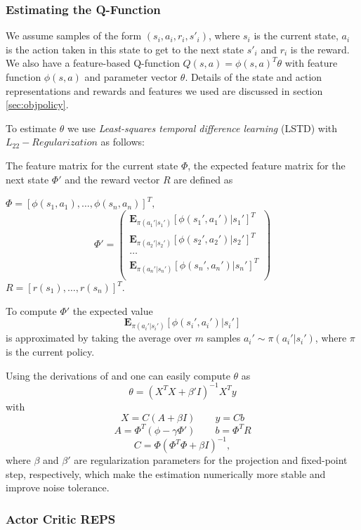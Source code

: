 \documentclass[twoside]{article}
\begin{document}
\subsubsection{Estimating the Q-Function}
\label{sec:estimateq}

We assume samples of the form $(s_i, a_i, r_i, s'_i)$,
where $s_i$ is the current state, $a_i$ is the action taken in this state to get
to the next state $s'_i$ and $r_i$ is the reward.
We also have a feature-based Q-function $Q(s, a) =
\phi(s,a)^T \theta$ with feature function $\phi(s,a)$ and parameter vector
$\theta$. Details of the state and action representations and rewards and
features we used are discussed in section \ref{sec:objpolicy}.

To estimate $\theta$ we use \emph{Least-squares temporal difference
learning} (LSTD) with $L_{22}-Regularization$\cite{lstdRegularization} as
follows:

The feature matrix for the current state $\Phi$, the expected feature matrix for
the next state $\Phi'$ and the reward vector $R$ are defined as

$\Phi = \left[\phi(s_1, a_1), \dots, \phi(s_n, a_n)\right]^T,$
$$
\Phi' = \left(
\begin{array}{c}
    \mathbf{E}_{\pi(a_1'|s_1')} [\phi(s_1', a_1') | s_1']^T \\
    \mathbf{E}_{\pi(a_2'|s_2')} [\phi(s_2', a_2') | s_2']^T \\
    \dots \\
    \mathbf{E}_{\pi(a_n'|s_n')} [\phi(s_n', a_n') | s_n']^T \\
\end{array} \right)
$$
$R = \left[r(s_1), \dots, r(s_n)\right]^T.$

To compute $\Phi'$ the expected value
$$
\mathbf{E}_{\pi(a_i'|s_i')} [\phi(s_i', a_i') | s_i']
$$
is approximated by taking the average over $m$ samples $a_i' \sim
\pi(a_i'|s_i')$, where $\pi$ is the current policy.

Using the derivations of \cite{lspi} and \cite{lstdRegularization} one can easily
compute $\theta$ as
$$
\theta = (X^TX+\beta'I)^{-1}X^Ty
$$
with
$$X = C(A+\beta I) \qquad y=Cb$$
$$A = \Phi^T(\phi-\gamma \Phi') \qquad b=\Phi^T R$$
$$C = \Phi(\Phi^T\Phi+\beta I)^{-1},$$
where $\beta$ and $\beta'$ are regularization parameters for the projection and
fixed-point step, respectively, which make the estimation numerically more
stable and improve noise tolerance.

\subsubsection{Actor Critic REPS}
\label{sec:reps}
\end{document}
